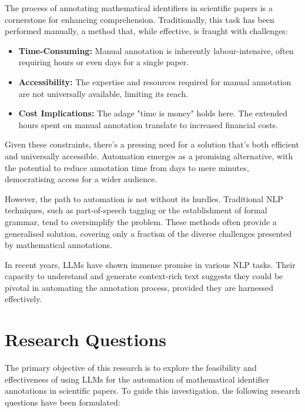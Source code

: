 The process of annotating mathematical identifiers in scientific papers is a cornerstone for enhancing comprehension. Traditionally, this task has been performed manually, a method that, while effective, is fraught with challenges:

\begin{itemize}
    \item \textbf{Time-Consuming:} Manual annotation is inherently labour-intensive, often requiring hours or even days for a single paper.
    
    \item \textbf{Accessibility:} The expertise and resources required for manual annotation are not universally available, limiting its reach.
    
    \item \textbf{Cost Implications:} The adage "time is money" holds here. The extended hours spent on manual annotation translate to increased financial costs.
\end{itemize}

Given these constraints, there's a pressing need for a solution that's both efficient and universally accessible. Automation emerges as a promising alternative, with the potential to reduce annotation time from days to mere minutes, democratising access for a wider audience.

However, the path to automation is not without its hurdles. Traditional \ac{NLP} techniques, such as part-of-speech tagging or the establishment of formal grammar, tend to oversimplify the problem. These methods often provide a generalised solution, covering only a fraction of the diverse challenges presented by mathematical annotations. 

In recent years, LLMs have shown immense promise in various NLP tasks. Their capacity to understand and generate context-rich text suggests they could be pivotal in automating the annotation process, provided they are harnessed effectively.

\section{Research Questions}

The primary objective of this research is to explore the feasibility and effectiveness of using LLMs for the automation of mathematical identifier annotations in scientific papers. To guide this investigation, the following research questions have been formulated:

